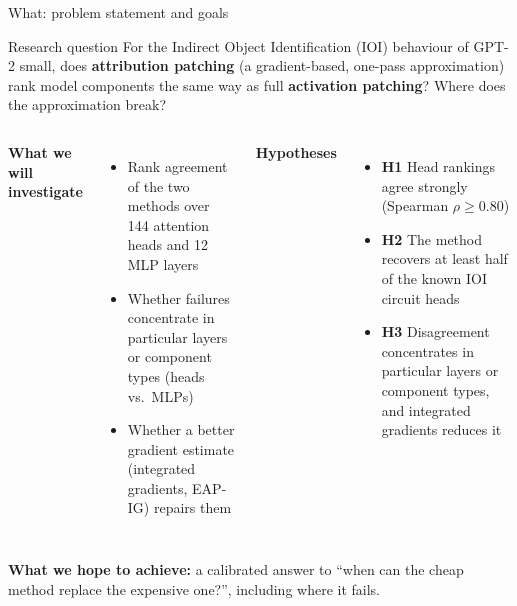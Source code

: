 \documentclass[aspectratio=169,10pt]{beamer}
\begin{document}
\begin{frame}{What: problem statement and goals}
\begin{block}{Research question}
For the Indirect Object Identification (IOI) behaviour of GPT-2 small, does \textbf{attribution patching} (a gradient-based, one-pass approximation) rank model components the same way as full \textbf{activation patching}? Where does the approximation break?
\end{block}
\vspace{0.3em}
\begin{columns}[T]
\textbf{What we will investigate}
\begin{itemize}
\item Rank agreement of the two methods over 144 attention heads and 12 MLP layers
\item Whether failures concentrate in particular layers or component types (heads vs.\ MLPs)
\item Whether a better gradient estimate (integrated gradients, EAP-IG) repairs them
\end{itemize}
\textbf{Hypotheses}
\begin{itemize}
\item \textbf{H1} Head rankings agree strongly (Spearman $\rho \ge 0.80$)
\item \textbf{H2} The method recovers at least half of the known IOI circuit heads
\item \textbf{H3} Disagreement concentrates in particular layers or component types, and integrated gradients reduces it
\end{itemize}
\end{columns}
\vspace{0.3em}
\textbf{What we hope to achieve:} a calibrated answer to ``when can the cheap method replace the expensive one?'', including where it fails.
\end{frame}
\end{document}
